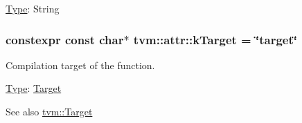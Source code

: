 \hyperlink{classtvm_1_1Type}{Type}\+: String 
\subsubsection[{\texorpdfstring{k\+Target}{kTarget}}]{\setlength{\rightskip}{0pt plus 5cm}constexpr const char$\ast$ tvm\+::attr\+::k\+Target = \char`\"{}target\char`\"{}}\hypertarget{namespacetvm_1_1attr_a580ae92d00e34f0a8f0d40395b8d972c}{}\label{namespacetvm_1_1attr_a580ae92d00e34f0a8f0d40395b8d972c}


Compilation target of the function. 

\hyperlink{classtvm_1_1Type}{Type}\+: \hyperlink{classtvm_1_1Target}{Target}

\begin{DoxySeeAlso}{See also}
\hyperlink{classtvm_1_1Target}{tvm\+::\+Target} 
\end{DoxySeeAlso}
